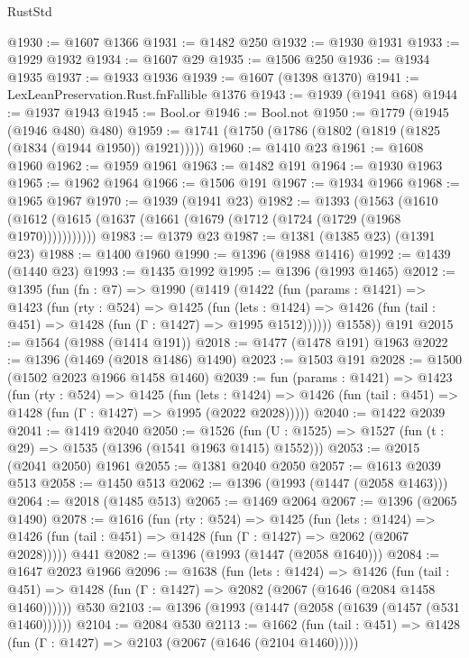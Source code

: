 \begin{lexlean}{RustStd}
\begin{coremodule}
@1930 := @1607 @1366
@1931 := @1482 @250
@1932 := @1930 @1931
@1933 := @1929 @1932
@1934 := @1607 @29
@1935 := @1506 @250
@1936 := @1934 @1935
@1937 := @1933 @1936
@1939 := @1607 (@1398 @1370)
@1941 := LexLeanPreservation.Rust.fnFallible @1376
@1943 := @1939 (@1941 @68)
@1944 := @1937 @1943
@1945 := Bool.or
@1946 := Bool.not
@1950 := @1779 (@1945 (@1946 @480) @480)
@1959 := @1741 (@1750 (@1786 (@1802 (@1819 (@1825 (@1834 (@1944 @1950)) @1921)))))
@1960 := @1410 @23
@1961 := @1608 @1960
@1962 := @1959 @1961
@1963 := @1482 @191
@1964 := @1930 @1963
@1965 := @1962 @1964
@1966 := @1506 @191
@1967 := @1934 @1966
@1968 := @1965 @1967
@1970 := @1939 (@1941 @23)
@1982 := @1393
    (@1563 (@1610 (@1612 (@1615 (@1637 (@1661 (@1679 (@1712 (@1724 (@1729 (@1968 @1970)))))))))))
@1983 := @1379 @23
@1987 := @1381 (@1385 @23) (@1391 @23)
@1988 := @1400 @1960
@1990 := @1396 (@1988 @1416)
@1992 := @1439 (@1440 @23)
@1993 := @1435 @1992
@1995 := @1396 (@1993 @1465)
@2012 := @1395
    (fun (fn : @7) =>
    @1990
      (@1419
        (@1422
          (fun (params : @1421) =>
          @1423
            (fun (rty : @524) =>
            @1425
              (fun (lets : @1424) =>
              @1426 (fun (tail : @451) => @1428 (fun (Γ : @1427) => @1995 @1512))))))
        @1558))
    @191
@2015 := @1564 (@1988 (@1414 @191))
@2018 := @1477 (@1478 @191) @1963
@2022 := @1396 (@1469 (@2018 @1486) @1490)
@2023 := @1503 @191
@2028 := @1500 (@1502 @2023 @1966 @1458 @1460)
@2039 := fun (params : @1421) =>
  @1423
    (fun (rty : @524) =>
    @1425
      (fun (lets : @1424) =>
      @1426 (fun (tail : @451) => @1428 (fun (Γ : @1427) => @1995 (@2022 @2028)))))
@2040 := @1422 @2039
@2041 := @1419 @2040
@2050 := @1526 (fun (U : @1525) => @1527 (fun (t : @29) => @1535 (@1396 (@1541 @1963 @1415) @1552)))
@2053 := @2015 (@2041 @2050) @1961
@2055 := @1381 @2040 @2050
@2057 := @1613 @2039 @513
@2058 := @1450 @513
@2062 := @1396 (@1993 (@1447 (@2058 @1463)))
@2064 := @2018 (@1485 @513)
@2065 := @1469 @2064
@2067 := @1396 (@2065 @1490)
@2078 := @1616
    (fun (rty : @524) =>
    @1425
      (fun (lets : @1424) =>
      @1426 (fun (tail : @451) => @1428 (fun (Γ : @1427) => @2062 (@2067 @2028)))))
    @441
@2082 := @1396 (@1993 (@1447 (@2058 @1640)))
@2084 := @1647 @2023 @1966
@2096 := @1638
    (fun (lets : @1424) =>
    @1426
      (fun (tail : @451) => @1428 (fun (Γ : @1427) => @2082 (@2067 (@1646 (@2084 @1458 @1460))))))
    @530
@2103 := @1396 (@1993 (@1447 (@2058 (@1639 (@1457 (@531 @1460))))))
@2104 := @2084 @530
@2113 := @1662
    (fun (tail : @451) => @1428 (fun (Γ : @1427) => @2103 (@2067 (@1646 (@2104 @1460)))))

\end{coremodule}
\end{lexlean}
